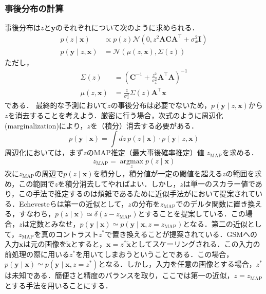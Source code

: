 \subsubsection{事後分布の計算}事後分布は$z$と$\mathbf{y}$のそれぞれについて次のように求められる．
$$
\begin{aligned}
p(z \mid \mathbf{x}) &\propto p(z) \mathcal{N}\left(0, z^{2} \mathbf{A C A}^{\top}+\sigma_{x}^{2} \mathbf{I}\right)\\
p(\mathbf{y} \mid z, \mathbf{x})& = \mathcal{N}\left(\mu(z, \mathbf{x}), \Sigma(z)\right)
\end{aligned}
$$
ただし，
$$
\begin{aligned}
\Sigma(z)&=\left(\mathbf{C}^{-1}+\frac{z^{2}}{\sigma_{x}^{2}} \mathbf{A}^{\top} \mathbf{A}\right)^{-1}\\
\mu(z, \mathbf{x})&=\frac{z}{\sigma_{x}^{2}} \Sigma(z) \mathbf{A}^{\top} \mathbf{x}
\end{aligned}
$$
である．
最終的な予測において$z$の事後分布は必要でないため，$p(\mathbf{y} \mid z, \mathbf{x})$から$z$を消去することを考えよう．厳密に行う場合，次式のように周辺化(marginalization)により，$z$を（積分）消去する必要がある．
$$
p(\mathbf{y} \mid \mathbf{x}) = \int dz\ p(z\mid \mathbf{x})\cdot p(\mathbf{y} \mid z, \mathbf{x})
$$
周辺化においては，まず$z$のMAP推定（最大事後確率推定）値 $z_{\mathrm{MAP}}$を求める．
$$
z_{\mathrm{MAP}} = \underset{z}{\operatorname{argmax}} p(z\mid \mathbf{x})
$$
次に$z_{\mathrm{MAP}}$の周辺で$p(z\mid \mathbf{x})$を積分し，積分値が一定の閾値を超える$z$の範囲を求め，この範囲で$z$を積分消去してやればよい．しかし，$z$は単一のスカラー値であり，この手法で推定するのは煩雑であるために近似手法が\cite{Echeveste2017-wu}において提案されている．Echevesteらは第一の近似として，$z$の分布を$z_{\mathrm{MAP}}$でのデルタ関数に置き換える，すなわち，$p(z\mid \mathbf{x})\simeq \delta (z-z_{\mathrm{MAP}})$とすることを提案している．この場合，$z$は定数とみなせ，$p(\mathbf{y} \mid \mathbf{x})\simeq p(\mathbf{y} \mid \mathbf{x}, z=z_{\mathrm{MAP}})$となる．第二の近似として，$z_{\mathrm{MAP}}$を真のコントラスト$z^*$で置き換えることが提案されている．GSMへの入力$\mathbf{x}$は元の画像を$\mathbf{\tilde x}$とすると，$\mathbf{x}=z^* \mathbf{\tilde x}$としてスケーリングされる．この入力の前処理の際に用いる$z^*$を用いてしまおうということである．この場合，$p(\mathbf{y} \mid \mathbf{x})\simeq p(\mathbf{y} \mid \mathbf{x}, z=z^*)$となる．しかし，入力を任意の画像とする場合，$z^*$は未知である．簡便さと精度のバランスを取り，ここでは第一の近似，$z=z_{\mathrm{MAP}}$とする手法を用いることにする．